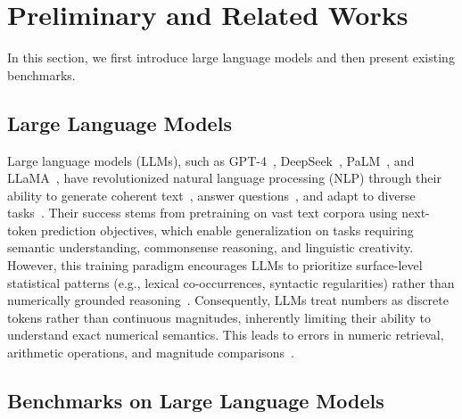 \section{Preliminary and Related Works}
In this section, we first introduce large language models and then present existing benchmarks.


\subsection{Large Language Models}
Large language models (LLMs), such as GPT-4~\citep{achiam2023gpt}, 
DeepSeek~\citep{liu2024deepseek}, 
PaLM~\citep{anil2023palm}, 
and LLaMA~\citep{touvron2023llama}, 
have revolutionized natural language processing (NLP) through their ability to generate coherent text~\citep{cho2019coherentcohesivelongformtext}, 
answer questions~\citep{chen2024analyze}, 
and adapt to diverse tasks~\citep{wang2025graph,jiang2024survey}. 
Their success stems from pretraining on vast text corpora using next-token prediction objectives, 
which enable generalization on tasks requiring semantic understanding, commonsense reasoning, and linguistic creativity.
However, this training paradigm encourages LLMs to prioritize surface-level statistical patterns 
(e.g., lexical co-occurrences, syntactic regularities) rather than numerically grounded reasoning~\citep{bachmann2024pitfalls}. 
Consequently, LLMs treat numbers as discrete tokens rather than continuous magnitudes, inherently limiting their ability to understand exact numerical semantics. 
This leads to errors in numeric retrieval, arithmetic operations, and magnitude comparisons~\citep{qiu2024dissecting}.







\subsection{Benchmarks on Large Language Models}

